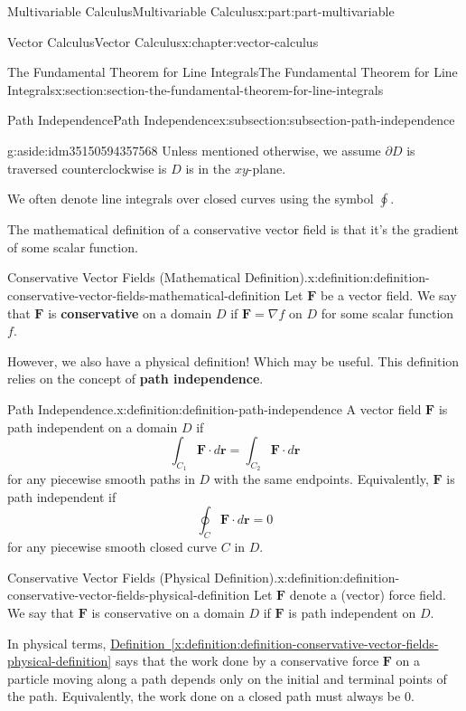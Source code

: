 \documentclass[twoside,10pt,]{tufte-book}
\newcommand{\xreffont}{\relax}
\newcommand{\terminology}[1]{\textbf{#1}}
\numberwithin{equation}{part}
\newcommand{\grad}{\nabla}
\newcommand{\vb}[1]{\mathbf{#1}}
\newcommand{\dr}{\cdot d\vb{r}}
\begin{document}
\begin{partptx}{Multivariable Calculus}{}{Multivariable Calculus}{}{}{x:part:part-multivariable}
\begin{chapterptx}{Vector Calculus}{}{Vector Calculus}{}{}{x:chapter:vector-calculus}
\begin{sectionptx}{The Fundamental Theorem for Line Integrals}{}{The Fundamental Theorem for Line Integrals}{}{}{x:section:section-the-fundamental-theorem-for-line-integrals}
\begin{subsectionptx}{Path Independence}{}{Path Independence}{}{}{x:subsection:subsection-path-independence}
\begin{aside}{}{g:aside:idm35150594357568}
Unless mentioned otherwise, we assume \(\partial D\) is traversed counterclockwise is \(D\) is in the \(xy\)-plane.%
\end{aside}
 We often denote line integrals over closed curves using the symbol \(\oint\).%
\par
The mathematical definition of a conservative vector field is that it's the gradient of some scalar function.%
\begin{definition}{Conservative Vector Fields (Mathematical Definition).}{x:definition:definition-conservative-vector-fields-mathematical-definition}%
%
Let \(\vb{F}\) be a vector field. We say that \(\vb{F}\) is \terminology{conservative} on a domain \(D\) if \(\vb{F} = \grad f\) on \(D\) for some scalar function \(f\).%
\end{definition}
However, we also have a physical definition! Which may be useful. This definition relies on the concept of \terminology{path independence}.%
\begin{definition}{Path Independence.}{x:definition:definition-path-independence}%
%
A vector field \(\vb{F}\) is path independent on a domain \(D\) if%
\begin{equation*}
\int_{C_{1}}\vb{F}\dr = \int_{C_{2}}\vb{F}\cdot d\vb{r}
\end{equation*}
for any piecewise smooth paths in \(D\) with the same endpoints. Equivalently, \(\vb{F}\) is path independent if%
\begin{equation*}
\oint_{C}\vb{F}\cdot d\vb{r} = 0
\end{equation*}
for any piecewise smooth closed curve \(C\) in \(D\).%
\end{definition}
\begin{definition}{Conservative Vector Fields (Physical Definition).}{x:definition:definition-conservative-vector-fields-physical-definition}%
Let \(\vb{F}\) denote a (vector) force field. We say that \(\vb{F}\) is conservative on a domain \(D\) if \(\vb{F}\) is path independent on \(D\).%
\end{definition}
In physical terms, \hyperref[x:definition:definition-conservative-vector-fields-physical-definition]{Definition~{\xreffont\ref{x:definition:definition-conservative-vector-fields-physical-definition}}} says that the work done by a conservative force \(\vb{F}\) on a particle moving along a path depends only on the initial and terminal points of the path. Equivalently, the work done on a closed path must always be \(0\).%

\end{subsectionptx}
\end{sectionptx}
\end{chapterptx}
\end{partptx}
\end{document}
